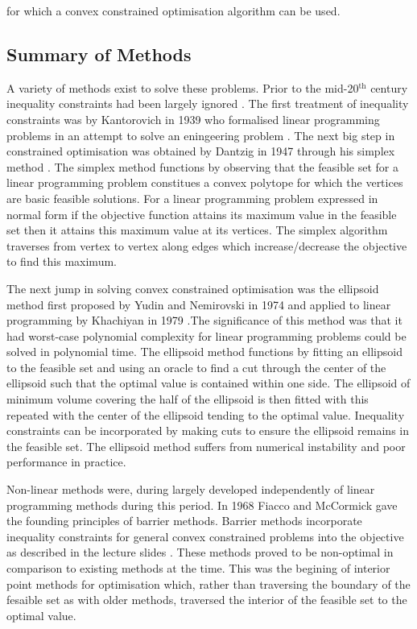 \documentclass[a4paper,10pt]{article}
\begin{document}
for which a convex constrained optimisation algorithm can be used.

\subsection{Summary of Methods}
A variety of methods exist to solve these problems. Prior to the
mid-20$^{\text{th}}$ century inequality constraints had been largely
ignored \cite{tikhomirov1996evolution}. The first treatment of inequality
constraints was by Kantorovich in 1939 who formalised linear programming
problems in an attempt to solve an eningeering problem
\cite{kantorovich1960mathematical}. The next big step in
constrained optimisation was obtained by Dantzig in 1947 through his simplex
method \cite{dantzig1966simplexmethode}. The
simplex method functions by observing that the feasible set for a linear
programming problem constitues a convex polytope for which the vertices are
basic feasible solutions. For a linear programming problem expressed in normal
form if the objective function attains its maximum value in the feasible set
then it attains this maximum value at its vertices. The simplex algorithm
traverses from vertex to vertex along edges which increase/decrease the
objective to find this maximum.

The next jump in solving convex constrained optimisation was the
ellipsoid method first proposed by Yudin and Nemirovski in 1974
\cite{nemirovsky1983informational} and applied to linear
programming by Khachiyan in 1979 \cite{khachiyan1980polynomial}.The significance of this method was that it had worst-case
polynomial complexity for linear programming problems could be solved in
polynomial time. The ellipsoid method functions by fitting an ellipsoid to the
feasible set and using an oracle to find a cut through the center of the
ellipsoid such that the optimal value is contained within one side. The
ellipsoid of minimum volume covering the half of the ellipsoid is then fitted
with this repeated with the center of the ellipsoid tending to the optimal
value. Inequality constraints can be incorporated by making cuts to ensure the
ellipsoid remains in the feasible set. The ellipsoid method suffers from
numerical instability and poor performance in practice.

Non-linear methods were, during largely developed independently of linear
programming methods during this period. In 1968 Fiacco and McCormick gave the
founding principles of barrier methods. Barrier methods incorporate inequality
constraints for general convex constrained problems into the objective as
described in the lecture slides \cite{fiacco1968nonlinear}. These methods proved
to be non-optimal in comparison to existing methods at the time. This was the
begining of interior point methods for optimisation which, rather than
traversing the boundary of the fesaible set as with older methods, traversed the
interior of the feasible set to the optimal value.
\end{document}
